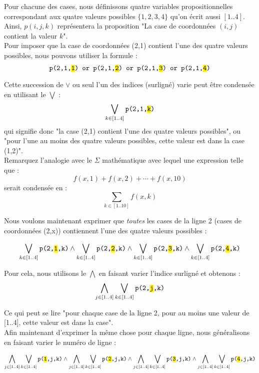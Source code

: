 Pour chacune des cases, nous définissons quatre variables propositionnelles correspondant aux quatre valeurs possibles $\{1,2,3,4\}$ qu'on écrit aussi $[1..4]$. Ainsi, $p(i,j,k)$ représentera la proposition "La case de coordonnées $(i,j)$ contient la valeur $k$".\\

Pour imposer que la case de coordonnées (2,1) contient l'une des quatre valeurs possibles, nous pouvons utiliser la formule : \\
\[\texttt{p(2,1,\hl{1}) or p(2,1,\hl{2}) or p(2,1,\hl{3}) or p(2,1,\hl{4})}\]

Cette succession de $\vee$ ou seul l'un des indices (surligné) varie peut être condensée en utilisant le $\bigvee$ : 
\[\bigvee_{k\in [1..4]} \texttt{p(2,1,\hl{k})} \]
qui signifie donc "la case (2,1) contient l'une des quatre valeurs possibles", ou "pour l'une au moins des quatre valeurs possibles, cette valeur est dans la case (1,2)". \\

\noindent Remarquez l'analogie avec le $\Sigma$ mathématique avec lequel une expression telle que : 
\[f(x,1)+f(x,2)+\cdots+f(x,10)\]
serait condensée en :
\[\sum_{k\in[1..10]} f(x,k)\]


Nous voulons maintenant exprimer que \emph{toutes} les cases de la ligne 2 (cases de coordonnées (2,x)) contiennent l'une des quatre valeurs possibles : 

\[\bigvee_{k\in [1..4]} \texttt{p(2,\hl{1},k)} \wedge \bigvee_{k\in [1..4]} \texttt{p(2,\hl{2},k)}\wedge
\bigvee_{k\in [1..4]} \texttt{p(2,\hl{3},k)} \wedge
\bigvee_{k\in [1..4]} \texttt{p(2,\hl{4},k)}\] 

Pour cela, nous utilisons le $\bigwedge$ en faisant varier l'indice surligné et obtenons : 
\[\bigwedge_{j\in [1..4]}\bigvee_{k\in [1..4]} \texttt{p(2,\hl{j},k)}\]

Ce qui peut se lire "pour chaque case de la ligne 2, pour au moins une valeur de [1..4], cette valeur est dans la case". \\

Afin maintenant d'exprimer la même chose pour chaque ligne, nous généralisons en faisant varier le numéro de ligne : 

\[\bigwedge_{j\in [1..4]}\bigvee_{k\in [1..4]} \texttt{p(\hl{1},j,k)}\wedge \bigwedge_{j\in [1..4]}\bigvee_{k\in [1..4]} \texttt{p(\hl{2},j,k)}\wedge \bigwedge_{j\in [1..4]}\bigvee_{k\in [1..4]} \texttt{p(\hl{3},j,k)}\wedge \bigwedge_{j\in [1..4]}\bigvee_{k\in [1..4]} \texttt{p(\hl{4},j,k)}\]


